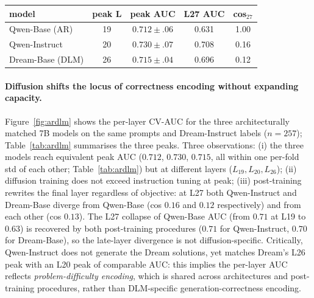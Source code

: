 \documentclass[11pt]{article}
\makeatletter
\providecommand{\linenumbers}{}
\providecommand{\nolinenumbers}{}
\let\old@table\table
\let\old@endtable\endtable
\renewenvironment{table}[1][]{%
  \nolinenumbers\old@table[#1]%
}{%
  \old@endtable\linenumbers%
}
\makeatother
\begin{document}
\begin{table}[!t]
  \centering\small
  \setlength{\tabcolsep}{3pt}
  \begin{tabular}{lcccc}
    \toprule
    model & peak L & peak AUC & L27 AUC & cos$_{27}$ \\
    \midrule
    Qwen-Base (AR)    & 19 & $0.712{\pm}.06$ & 0.631 & 1.00 \\
    Qwen-Instruct     & 20 & $0.730{\pm}.07$ & 0.708 & 0.16 \\
    Dream-Base (DLM)  & 26 & $0.715{\pm}.04$ & 0.696 & 0.12 \\
    \bottomrule
  \end{tabular}
  \caption{Per-layer CV-AUC peaks on MBPP-Dream labels ($n{=}257$, $\pm$ per-fold std). The three peaks lie within one standard deviation of one another, so peak capacity is statistically indistinguishable while the locus shifts from L19/20 to L26. At L27 both post-trained models diverge from Qwen-Base (cos $\!<\!0.17$); the rewrite is not diffusion-specific.}
  \label{tab:ardlm}
\end{table}

\paragraph{Diffusion shifts the locus of correctness encoding without expanding capacity.}
\label{sec:ardlm}
Figure~\ref{fig:ardlm} shows the per-layer CV-AUC for the three architecturally matched 7B models on the same prompts and Dream-Instruct labels ($n{=}257$); Table~\ref{tab:ardlm} summarises the three peaks.
Three observations:
(i) the three models reach equivalent peak AUC ($0.712$, $0.730$, $0.715$, all within one per-fold std of each other; Table~\ref{tab:ardlm}) but at different layers ($L_{19}, L_{20}, L_{26}$);
(ii) diffusion training does not exceed instruction tuning at peak;
(iii) post-training rewrites the final layer regardless of objective: at L27 both Qwen-Instruct and Dream-Base diverge from Qwen-Base (cos $0.16$ and $0.12$ respectively) and from each other (cos $0.13$).
The L27 collapse of Qwen-Base AUC (from $0.71$ at L19 to $0.63$) is recovered by both post-training procedures ($0.71$ for Qwen-Instruct, $0.70$ for Dream-Base), so the late-layer divergence is not diffusion-specific.
Critically, Qwen-Instruct does not generate the Dream solutions, yet matches Dream's L26 peak with an L20 peak of comparable AUC: this implies the per-layer AUC reflects \emph{problem-difficulty encoding}, which is shared across architectures and post-training procedures, rather than DLM-specific generation-correctness encoding.
\end{document}
